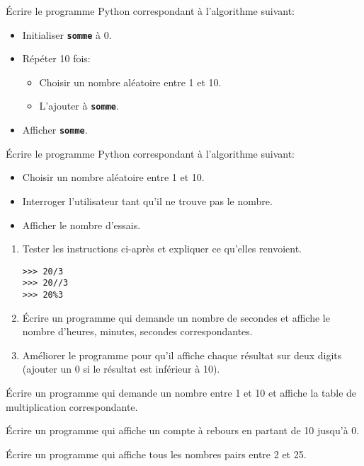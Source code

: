 \documentclass[a4paper,11pt]{article}
\begin{document}
\begin{exo}
Écrire le programme Python correspondant à l'algorithme suivant:
\begin{itemize}
    \item Initialiser \textbf{\texttt{somme}} à 0.
    \item Répéter 10 fois:
    \begin{itemize}
        \item Choisir un nombre aléatoire entre 1 et 10.
        \item L'ajouter à \textbf{\texttt{somme}}.
    \end{itemize}
    \item Afficher \textbf{\texttt{somme}}.
\end{itemize}
\end{exo}
\begin{exo}
    Écrire le programme Python correspondant à l'algorithme suivant:
\begin{itemize}
    \item Choisir un nombre aléatoire entre 1 et 10.
    \item Interroger l'utilisateur tant qu'il ne trouve pas le nombre.
    \item Afficher le nombre d'essais.
\end{itemize}
\end{exo}
\begin{exo}
\begin{enumerate}
\item Tester les instructions ci-après et expliquer ce qu'elles renvoient.
\begin{lstlisting}
>>> 20/3
>>> 20//3
>>> 20%3
\end{lstlisting}
\item Écrire un programme qui demande un nombre de secondes et affiche le nombre d'heures, minutes, secondes correspondantes.
\item Améliorer le programme pour qu'il affiche chaque résultat sur deux digits (ajouter un 0 si le résultat est inférieur à 10).
\end{enumerate}
\end{exo}
\begin{exo}
Écrire un programme qui demande un nombre entre 1 et 10 et affiche la table de multiplication correspondante.
\end{exo}
\begin{exo}
Écrire un programme qui affiche un compte à rebours en partant de 10 jusqu'à 0.
\end{exo}
\begin{exo}
Écrire un programme qui affiche tous les nombres pairs entre 2 et 25.
\end{exo}
\end{document}
